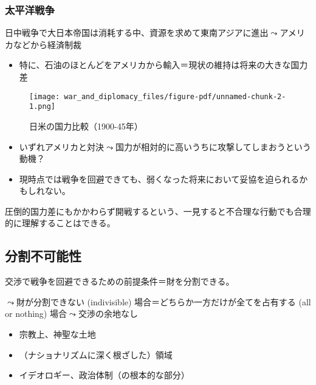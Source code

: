 \documentclass[
  xelatex,
  ja=standard]{bxjsarticle}
\providecommand{\tightlist}{%
  \setlength{\itemsep}{0pt}\setlength{\parskip}{0pt}}\usepackage{longtable,booktabs,array}
\begin{document}
\hypertarget{ux592aux5e73ux6d0bux6226ux4e89}{%
\subsubsection{太平洋戦争}\label{ux592aux5e73ux6d0bux6226ux4e89}}

日中戦争で大日本帝国は消耗する中、資源を求めて東南アジアに進出\(\leadsto\)アメリカなどから経済制裁

\begin{itemize}
\tightlist
\item
  特に、石油のほとんどをアメリカから輸入＝現状の維持は将来の大きな国力差
\end{itemize}

\begin{figure}[htpb]

{\centering \texttt{[image: war\_and\_diplomacy\_files/figure-pdf/unnamed-chunk-2-1.png]}

}

\caption{日米の国力比較（1900-45年）}

\end{figure}

\begin{itemize}
\tightlist
\item
  いずれアメリカと対決\(\leadsto\)国力が相対的に高いうちに攻撃してしまおうという動機？
\item
  現時点では戦争を回避できても、弱くなった将来において妥協を迫られるかもしれない。
\end{itemize}

圧倒的国力差にもかかわらず開戦するという、一見すると不合理な行動でも合理的に理解することはできる。

\hypertarget{ux5206ux5272ux4e0dux53efux80fdux6027}{%
\subsection{分割不可能性}\label{ux5206ux5272ux4e0dux53efux80fdux6027}}

交渉で戦争を回避できるための前提条件＝財を分割できる。

\(\leadsto\)財が分割できない (indivisible)
場合＝どちらか一方だけが全てを占有する (all or nothing)
場合\(\leadsto\)交渉の余地なし

\begin{itemize}
\tightlist
\item
  宗教上、神聖な土地
\item
  （ナショナリズムに深く根ざした）領域
\item
  イデオロギー、政治体制（の根本的な部分）
\end{itemize}
\end{document}
